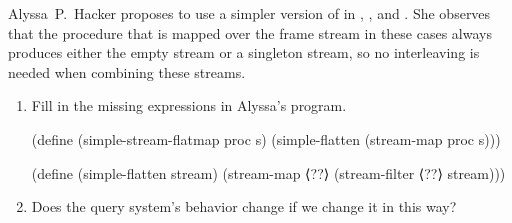 \begin{exercise}
	\label{Exercise 4.74}
	Alyssa~P.~Hacker proposes to use a simpler version of  in , , and .
	She observes that the procedure that is mapped over the frame stream in these cases always produces either the empty stream or a singleton stream, so no interleaving is needed when combining these streams.
	\begin{enumerate}[label = \alph*., leftmargin = *]

		\item
			Fill in the missing expressions in Alyssa’s program.

		\begin{scheme}
		  (define (simple-stream-flatmap proc s)
		    (simple-flatten (stream-map proc s)))

		  (define (simple-flatten stream)
		    (stream-map ⟨??⟩
		                (stream-filter ⟨??⟩ stream)))
		\end{scheme}

		\item
			Does the query system’s behavior change if we change it in this way?

	\end{enumerate}
\end{exercise}



